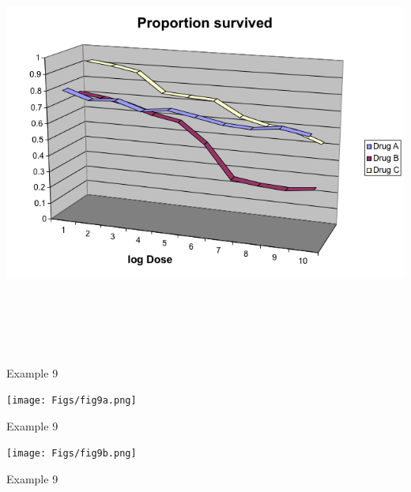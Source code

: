\documentclass[12pt]{article}
\newcommand{\headsize}{\fontsize{35}{35} \selectfont}
\begin{document}
\centerline{\includegraphics[height=5.5in]{Figs/fig8b.png}}


\newpage


\headsize \color{myyellow}
\hfill \begin{minipage}{5.75in}
\centering
Example 9
\end{minipage}

\vspace{30mm}

\centerline{\texttt{[image: Figs/fig9a.png]}}


\newpage


\headsize \color{myyellow}
\hfill \begin{minipage}{5.75in}
\centering
Example 9
\end{minipage}

\vspace{30mm}

\centerline{\texttt{[image: Figs/fig9b.png]}}


\newpage


\headsize \color{myyellow}
\hfill \begin{minipage}{5.75in}
\centering
Example 9
\end{minipage}

\vspace{30mm}
\end{document}
